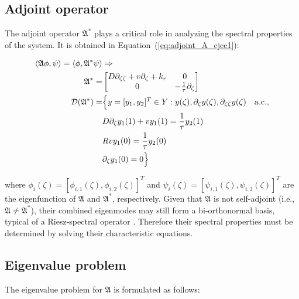 \subsection{Adjoint operator}

The adjoint operator $\mathfrak{A}^*$ plays a critical role in analyzing the spectral properties of the system. It is obtained in Equation~(\ref{eq:adjoint_A_cjce1}):

\begin{equation} \label{eq:adjoint_A_cjce1}
    \begin{aligned}
        \langle \mathfrak{A} {\phi}, {\psi}\rangle  = \langle {\phi}, {\mathfrak{A}}^{*} {\psi}\rangle  &\Rightarrow \\
        {\mathfrak{A}}^{*} =&
        \begin{bmatrix}
            D \partial_{\zeta \zeta} + v \partial_\zeta +k_r & 0\\
            0 & -\frac{1}{\tau} \partial_\zeta
        \end{bmatrix}\\
        \mathcal{D}(\mathfrak{A}^*) =& \Bigl\{ {y} = [y_1, y_2]^T \in Y:
        {y}(\zeta), \partial_\zeta {y}(\zeta), \partial_{\zeta \zeta} {y}(\zeta) \quad \mathrm{a.c.},\\
        &D \partial_\zeta y_1(1) + v y_1(1) = \frac{1}{\tau} y_2(1) \\
        &R v y_1(0) = \frac{1}{\tau} y_2(0) \\
        &\partial_\zeta y_1(0) = 0 \Bigr\}
    \end{aligned}
\end{equation}

where ${\phi_i}(\zeta) = [\phi_{i,1}(\zeta), \phi_{i,2}(\zeta)]^T$ and ${\psi_i}(\zeta) = [\psi_{i,1}(\zeta), \psi_{i,2}(\zeta)]^T$ are the eigenfunction of $\mathfrak{A}$ and $\mathfrak{A}^*$, respectively. Given that $\mathfrak{A}$ is not self-adjoint (i.e., $\mathfrak{A} \neq \mathfrak{A}^*$), their combined eigenmodes may still form a bi-orthonormal basis, typical of a Riesz-spectral operator \autocite{Curtain2020Introduction}. Therefore their spectral properties must be determined by solving their characteristic equations.

\subsection{Eigenvalue problem}

The eigenvalue problem for $\mathfrak{A}$ is formulated as follows:


